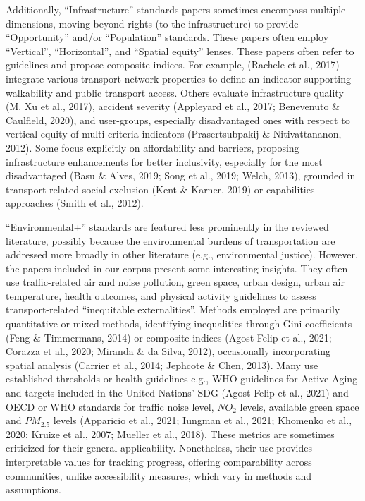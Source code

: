 \documentclass[
  letterpaper,
  DIV=11,
  numbers=noendperiod]{scrartcl}
\begin{document}
Additionally, ``Infrastructure'' standards papers sometimes encompass
multiple dimensions, moving beyond rights (to the infrastructure) to
provide ``Opportunity'' and/or ``Population'' standards. These papers
often employ ``Vertical'', ``Horizontal'', and ``Spatial equity''
lenses. These papers often refer to guidelines and propose composite
indices. For example, (Rachele et al., 2017) integrate various transport
network properties to define an indicator supporting walkability and
public transport access. Others evaluate infrastructure quality (M. Xu
et al., 2017), accident severity (Appleyard et al., 2017; Benevenuto \&
Caulfield, 2020), and user-groups, especially disadvantaged ones with
respect to vertical equity of multi-criteria indicators (Prasertsubpakij
\& Nitivattananon, 2012). Some focus explicitly on affordability and
barriers, proposing infrastructure enhancements for better inclusivity,
especially for the most disadvantaged (Basu \& Alves, 2019; Song et al.,
2019; Welch, 2013), grounded in transport-related social exclusion (Kent
\& Karner, 2019) or capabilities approaches (Smith et al., 2012).

``Environmental+'' standards are featured less prominently in the
reviewed literature, possibly because the environmental burdens of
transportation are addressed more broadly in other literature (e.g.,
environmental justice). However, the papers included in our corpus
present some interesting insights. They often use traffic-related air
and noise pollution, green space, urban design, urban air temperature,
health outcomes, and physical activity guidelines to assess
transport-related ``inequitable externalities''. Methods employed are
primarily quantitative or mixed-methods, identifying inequalities
through Gini coefficients (Feng \& Timmermans, 2014) or composite
indices (Agost-Felip et al., 2021; Corazza et al., 2020; Miranda \& da
Silva, 2012), occasionally incorporating spatial analysis (Carrier et
al., 2014; Jephcote \& Chen, 2013). Many use established thresholds or
health guidelines e.g., WHO guidelines for Active Aging and targets
included in the United Nations' SDG (Agost-Felip et al., 2021) and OECD
or WHO standards for traffic noise level, \(NO_2\) levels, available
green space and \(PM_{2.5}\) levels (Apparicio et al., 2021; Iungman et
al., 2021; Khomenko et al., 2020; Kruize et al., 2007; Mueller et al.,
2018). These metrics are sometimes criticized for their general
applicability. Nonetheless, their use provides interpretable values for
tracking progress, offering comparability across communities, unlike
accessibility measures, which vary in methods and assumptions.
\end{document}
